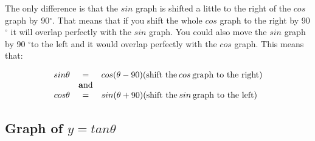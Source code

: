 The only difference is that the $sin$ graph is shifted a little to the right of the $cos$ graph by 90${}^{\circ }$. That means that if you shift the whole $cos$ graph to the right by 90 ${}^{\circ }$ it will overlap perfectly with the $sin$ graph. You could also move the $sin$ graph by 90 ${}^{\circ }$to the left and it would overlap perfectly with the $cos$ graph. This means that:\par 
\nopagebreak\noindent{}
\begin{equation*}
\begin{array}{ccc}\hfill sin\theta & =& cos(\theta -90)(\mbox{shift the}\phantom{\rule{2.pt}{0ex}}cos\phantom{\rule{2.pt}{0ex}}\mbox{graph to the right})\hfill \\ & \mathbf{a}\mbox{nd}& \\ \hfill cos\theta & =& sin(\theta +90)(\mbox{shift the}\phantom{\rule{2.pt}{0ex}}sin\phantom{\rule{2.pt}{0ex}}\mbox{graph to the left})\hfill \end{array}
\end{equation*}

\subsection{Graph of $y=tan\theta $ }
